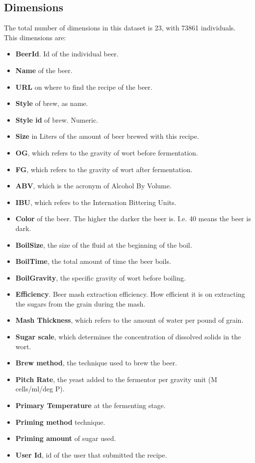 \subsection{Dimensions}
The total number of dimensions in this dataset is 23, with 73861 individuals. This dimensions are:
\begin{itemize}
  \item \textbf{BeerId}. Id of the individual beer.
  \item \textbf{Name} of the beer.
  \item \textbf{URL} on where to find the recipe of the beer.
  \item \textbf{Style} of brew, as name.
  \item \textbf{Style id} of brew. Numeric.
  \item \textbf{Size} in Liters of the amount of beer brewed with this recipe.
  \item \textbf{OG}, which refers to the gravity of wort before fermentation.
  \item \textbf{FG}, which refers to the gravity of wort after fermentation.
  \item \textbf{ABV}, which is the acronym of Alcohol By Volume.
  \item \textbf{IBU}, which refers to the Internation Bittering Units.
  \item \textbf{Color} of the beer. The higher the darker the beer is. I.e. 40 means the beer is dark.
  \item \textbf{BoilSize}, the size of the fluid at the beginning of the boil.
  \item \textbf{BoilTime}, the total amount of time the beer boils.
  \item \textbf{BoilGravity}, the specific gravity of wort before boiling.
  \item \textbf{Efficiency}. Beer mash extraction efficiency. How efficient it is on extracting the sugars from the grain during the mash.
  \item \textbf{Mash Thickness}, which refers to the amount of water per pound of grain.
  \item \textbf{Sugar scale}, which determines the concentration of dissolved solids in the wort.
  \item \textbf{Brew method}, the technique used to brew the beer.
  \item \textbf{Pitch Rate}, the yeast added to the fermentor per gravity unit (M cells/ml/deg P).
  \item \textbf{Primary Temperature} at the fermenting stage.
  \item \textbf{Priming method} technique.
  \item \textbf{Priming amount} of sugar used.
  \item \textbf{User Id}, id of the user that submitted the recipe.
\end{itemize}

